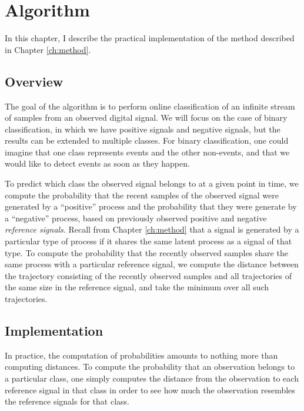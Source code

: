 \chapter{Algorithm}
\label{ch:alg}


In this chapter, I describe the practical implementation of the method described
in Chapter \ref{ch:method}.

\section{Overview}

The goal of the algorithm is to perform online classification of an infinite
stream of samples from an observed digital signal. We will focus on the case of
binary classification, in which we have positive signals and negative signals,
but the results can be extended to multiple classes.  For binary classification,
one could imagine that one class represents events and the other non-events, and
that we would like to detect events as soon as they happen.

To predict which class the observed signal belongs to at a given point in time,
we compute the probability that the recent samples of the observed signal were
generated by a ``positive'' process and the probability that they were generate
by a ``negative'' process, based on previously observed positive and negative
{\em reference signals}. Recall from Chapter \ref{ch:method} that a signal is
generated by a particular type of process if it shares the same latent process
as a signal of that type. To compute the probability that the recently observed
samples share the same process with a particular reference signal, we compute
the distance between the trajectory consisting of the recently observed samples
and all trajectories of the same size in the reference signal, and take the
minimum over all such trajectories. 

\section{Implementation}
In practice, the computation of probabilities amounts to nothing more than
computing distances. To compute the probability that an observation belongs to a
particular class, one simply computes the distance from the observation to each
reference signal in that class in order to see how much the observation
resembles the reference signals for that class.

